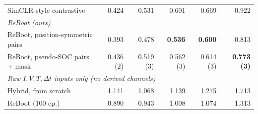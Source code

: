 \begin{table}[t]
\begin{tabular}{lrrrrr}
\quad SimCLR-style contrastive~\cite{chen2020simclr} & 0.424 & 0.531 & 0.601 & 0.669 & 0.922 \\
\multicolumn{6}{l}{\textit{ReBoot (ours)}} \\
\quad ReBoot, position-symmetric pairs & 0.393 & 0.478 & \textbf{0.536} & \textbf{0.600} & 0.813 \\
\quad ReBoot, pseudo-SOC pairs + mask & 0.436 (2) & 0.519 (3) & 0.562 (3) & 0.614 (3) & \textbf{0.773 (3)} \\
\midrule
\multicolumn{6}{l}{\textit{Raw $I,V,T,\Delta t$ inputs only (no derived channels)}} \\
\quad Hybrid, from scratch & 1.141 & 1.068 & 1.139 & 1.275 & 1.713 \\
\quad ReBoot (100 ep.) & 0.890 & 0.943 & 1.008 & 1.074 & 1.313 \\
\bottomrule
\end{tabular}
\end{table}